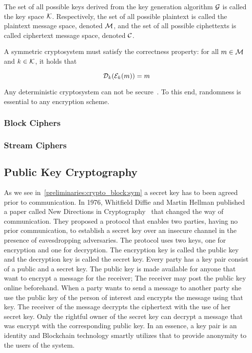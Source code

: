 The set of all possible keys derived from the key generation algorithm $\mathcal{G}$ is called the key space $\mathcal{K}$. Respectively, the set of all possible plaintext is called the plaintext message space, denoted $\mathcal{M}$, and the set of all possible ciphettexts is called ciphertext message space, denoted $\mathcal{C}$.

A symmetric cryptosystem must satisfy the correctness property: for all $m \in \mathcal{M}$ and $k \in \mathcal{K}$, it holds that

\begin{equation*}
  \mathcal{D}_{k}(\mathcal{E}_{k}(m)) = m
\end{equation*}

Any deterministic cryptosystem can not be secure~\cite{Katz:2014:IMC:2700550, kiagias:crypto}. To this end, randomness is essential to any encryption scheme.

\subsubsection{Block Ciphers}
\label{preliminaries:crypto_block:sym:block}

\subsubsection{Stream Ciphers}
\label{preliminaries:crypto_block:sym:stream}

\subsection{Public Key Cryptography}
\label{preliminaries:crypto_block:pub}

As we see in~\ref{preliminaries:crypto_block:sym} a secret key has to been agreed prior to communication. In 1976, Whitfield Diffie and Martin Hellman published a paper called New Directions in Cryptography~\cite{Diffie:2006:NDC:2263321.2269104} that changed the way of communication. They proposed a protocol that enables two parties, having no prior communication, to establish a secret key over an insecure channel in the presence of eavesdropping adversaries. The protocol uses two keys, one for encryption and one for decryption. The encryption key is called the public key and the decryption key is called the secret key. Every party has a key pair consist of a public and a secret key. The public key is made available for anyone that want to encrypt a message for the receiver; The receiver may post the public key online beforehand. When a party wants to send a message to another party she use the public key of the person of interest and encrypts the message using that key. The receiver of the message decrypts the ciphertext with the use of her secret key. Only the rightful owner of the secret key can decrypt a message that was encrypt with the corresponding public key. In an essence, a key pair is an identity and Blockchain technology smartly utilizes that to provide anonymity to the users of the system.

